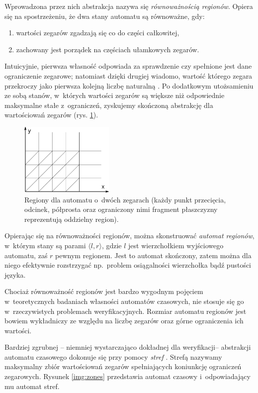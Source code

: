 \documentclass{pracamgr}
\newcommand{\pair}[2]{\langle #1, #2 \rangle}
\theoremstyle{plain}
\begin{document}
Wprowadzona przez nich abstrakcja nazywa się \emph{równoważnością
  regionów}. Opiera się na spostrzeżeniu, że dwa stany automatu są
równoważne, gdy:
\begin{samepage}
\begin{enumerate}
  \item wartości zegarów zgadzają się co do części całkowitej,
  \item zachowany jest porządek na częściach ułamkowych zegarów.
\end{enumerate}
\end{samepage}
Intuicyjnie, pierwsza własność odpowiada za sprawdzenie czy spełnione
jest dane ograniczenie zegarowe; natomiast dzięki drugiej wiadomo,
wartość którego zegara przekroczy jako pierwsza kolejną liczbę
naturalną \cite{am:decision}. Po dodatkowym utożsamieniu ze sobą stanów,
w~których wartości zegarów są większe niż odpowiednie maksymalne stałe
z~ograniczeń, zyskujemy skończoną abstrakcję dla wartościowań zegarów
(rys. \ref{img:regions}).
\begin{figure}
  \centering
  \includegraphics[width=0.4\textwidth]{img/ta-regions}
  \caption{Regiony dla automatu o~dwóch zegarach (każdy punkt
    przecięcia, odcinek, półprosta oraz ograniczony nimi fragment
    płaszczyzny reprezentują oddzielny region).}
  \label{img:regions}
\end{figure}

Opierając się na równoważności regionów, można skonstruować
\emph{automat regionów}, w~którym stany są parami $\pair{l}{r}$, gdzie
$l$ jest wierzchołkiem wyjściowego automatu, zaś $r$ pewnym
regionem. Jest to automat skończony, zatem można dla niego efektywnie
rozstrzygać np.~problem osiągalności wierzchołka bądź pustości języka.

Chociaż równoważność regionów jest bardzo wygodnym pojęciem
w~teoretycznych badaniach własności automatów czasowych, nie stosuje się
go w~rzeczywistych problemach weryfikacyjnych. Rozmiar automatu
regionów jest bowiem wykładniczy ze względu na liczbę zegarów oraz
górne ograniczenia ich wartości.

Bardziej zgrubnej -- niemniej wystarczająco dokładnej dla
weryfikacji-- abstrakcji automatu czasowego dokonuje się przy pomocy
\emph{stref} \cite{henz-94}. Strefą nazywamy maksymalny zbiór
wartościowań zegarów spełniających koniunkcję ograniczeń zegarowych.
Rysunek \ref{img:zones} przedstawia automat czasowy i~odpowiadający mu
automat stref.
\end{document}
